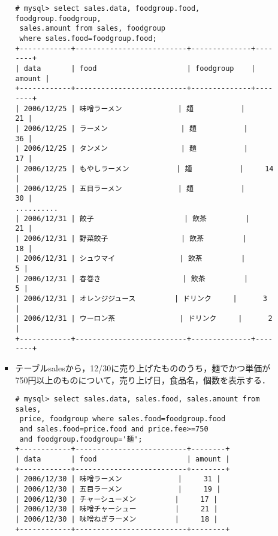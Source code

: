 \documentclass[a4j,titlepage]{jarticle}
\begin{document}
\begin{itemize}
\begin{itemize}
\begin{itemize}
\begin{center}
\begin{screen}
\begin{verbatim}
# mysql> select sales.data, foodgroup.food, foodgroup.foodgroup, 
 sales.amount from sales, foodgroup
 where sales.food=foodgroup.food;
+------------+--------------------------+--------------+--------+
| data       | food                     | foodgroup    | amount |
+------------+--------------------------+--------------+--------+
| 2006/12/25 | 味噌ラーメン             | 麺           |     21 |
| 2006/12/25 | ラーメン                 | 麺           |     36 |
| 2006/12/25 | タンメン                 | 麺           |     17 |
| 2006/12/25 | もやしラーメン           | 麺           |     14 |
| 2006/12/25 | 五目ラーメン             | 麺           |     30 |
..........
| 2006/12/31 | 餃子                     | 飲茶         |     21 |
| 2006/12/31 | 野菜餃子                 | 飲茶         |     18 |
| 2006/12/31 | シュウマイ               | 飲茶         |      5 |
| 2006/12/31 | 春巻き                   | 飲茶         |      5 |
| 2006/12/31 | オレンジジュース         | ドリンク     |      3 |
| 2006/12/31 | ウーロン茶               | ドリンク     |      2 |
+------------+--------------------------+--------------+--------+
\end{verbatim}
\end{screen}
\end{center}

\item テーブルsalesから，12/30に売り上げたもののうち，麺でかつ単価が750円以上のものについて，売り上げ日，食品名，個数を表示する．

\begin{center}
\begin{screen}
\begin{verbatim}
# mysql> select sales.data, sales.food, sales.amount from sales, 
 price, foodgroup where sales.food=foodgroup.food
 and sales.food=price.food and price.fee>=750 
 and foodgroup.foodgroup='麺';
+------------+--------------------------+--------+
| data       | food                     | amount |
+------------+--------------------------+--------+
| 2006/12/30 | 味噌ラーメン             |     31 |
| 2006/12/30 | 五目ラーメン             |     19 |
| 2006/12/30 | チャーシューメン         |     17 |
| 2006/12/30 | 味噌チャーシュー         |     21 |
| 2006/12/30 | 味噌ねぎラーメン         |     18 |
+------------+--------------------------+--------+
\end{verbatim}
\end{screen}
\end{center}


\end{itemize}
\end{itemize}
\end{itemize}
\end{document}

